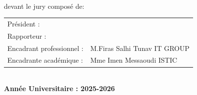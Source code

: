 \documentclass[12pt,a4paper]{report}
\begin{document}
\begin{titlepage}
\begin{center}
                             \\ [1cm]   
    devant le jury composé de: \\[1cm]   
\begin{tabular}{ll}
    Président : &                                       \\[0.3cm]
    Rapporteur : &                                       \\[0.5cm]
    Encadrant professionnel : & M.Firas Salhi    \hspace*{\fill}             Tunav IT GROUP\\
    Encadrante académique : & Mme Imen Messaoudi  \hspace*{\fill}  ISTIC \\
\end{tabular} \\ [0.6cm]
\textbf{Année Universitaire : 2025-2026}
 \end{center}
 \end{titlepage}
\end{document}
